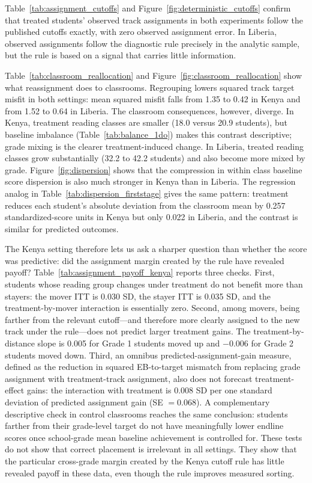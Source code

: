 \documentclass[11pt]{article}
\begin{document}
Table~\ref{tab:assignment_cutoffs} and Figure~\ref{fig:deterministic_cutoffs} confirm that treated students' observed track assignments in both experiments follow the published cutoffs exactly, with zero observed assignment error. In Liberia, observed assignments follow the diagnostic rule precisely in the analytic sample, but the rule is based on a signal that carries little information.

Table~\ref{tab:classroom_reallocation} and Figure~\ref{fig:classroom_reallocation} show what reassignment does to classrooms. Regrouping lowers squared track target misfit in both settings: mean squared misfit falls from 1.35 to 0.42 in Kenya and from 1.52 to 0.64 in Liberia. The classroom consequences, however, diverge. In Kenya, treatment reading classes are smaller (18.0 versus 20.9 students), but baseline imbalance (Table~\ref{tab:balance_1do}) makes this contrast descriptive; grade mixing is the clearer treatment-induced change. In Liberia, treated reading classes grow substantially (32.2 to 42.2 students) and also become more mixed by grade. Figure~\ref{fig:dispersion} shows that the compression in within class baseline score dispersion is also much stronger in Kenya than in Liberia. The regression analog in Table~\ref{tab:dispersion_firststage} gives the same pattern: treatment reduces each student's absolute deviation from the classroom mean by 0.257 standardized-score units in Kenya but only 0.022 in Liberia, and the contrast is similar for predicted outcomes.

The Kenya setting therefore lets us ask a sharper question than whether the score was predictive: did the assignment margin created by the rule have revealed payoff? Table~\ref{tab:assignment_payoff_kenya} reports three checks. First, students whose reading group changes under treatment do not benefit more than stayers: the mover ITT is 0.030 SD, the stayer ITT is 0.035 SD, and the treatment-by-mover interaction is essentially zero. Second, among movers, being farther from the relevant cutoff---and therefore more clearly assigned to the new track under the rule---does not predict larger treatment gains. The treatment-by-distance slope is 0.005 for Grade 1 students moved up and $-0.006$ for Grade 2 students moved down. Third, an omnibus predicted-assignment-gain measure, defined as the reduction in squared EB-to-target mismatch from replacing grade assignment with treatment-track assignment, also does not forecast treatment-effect gains: the interaction with treatment is 0.008 SD per one standard deviation of predicted assignment gain (SE $=0.068$). A complementary descriptive check in control classrooms reaches the same conclusion: students farther from their grade-level target do not have meaningfully lower endline scores once school-grade mean baseline achievement is controlled for. These tests do not show that correct placement is irrelevant in all settings. They show that the particular cross-grade margin created by the Kenya cutoff rule has little revealed payoff in these data, even though the rule improves measured sorting.
\end{document}
